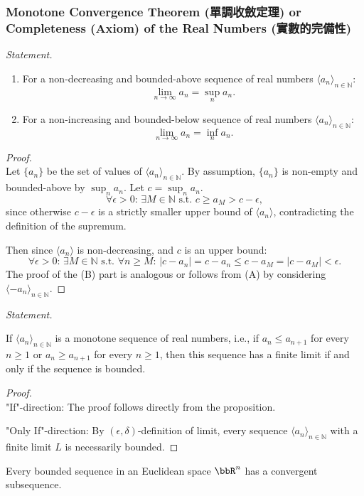 \documentclass[a4paper,12pt]{report}
\begin{document}
\subsubsection{Monotone Convergence Theorem (單調收斂定理) or Completeness (Axiom) of the Real Numbers (實數的完備性)}
\textit{Statement.}
\begin{enumerate}[label=(\Alph*)]
\item For a non-decreasing and bounded-above sequence of real numbers $\langle a_n\rangle_{n\in\mathbb {N}}$:
\[\lim_{n\to\infty}a_n=\sup_n a_n.\]
\item For a non-increasing and bounded-below sequence of real numbers $\langle a_n\rangle_{n\in\mathbb {N}}$:
\[\lim_{n\to\infty}a_n=\inf_n a_n.\]
\end{enumerate}
\begin{proof}\mbox{}\\
Let $\{a_{n}\}$ be the set of values of $\langle a_n\rangle_{n\in\mathbb {N}}$. By assumption, $\{a_n\}$ is non-empty and bounded-above by $\sup_n a_n$. Let $c=\sup_n a_n$.
\[\forall\epsilon>0:\,\exists M\in\mathbb {N}\text{\ s.t.\ }c\geq a_M>c-\epsilon,\]
since otherwise $c-\epsilon$ is a strictly smaller upper bound of $\langle a_n\rangle$, contradicting the definition of the supremum. 

Then since $\langle a_n\rangle$ is non-decreasing, and $c$ is an upper bound:
\[\forall\epsilon>0:\,\exists M\in\mathbb {N}\text{\ s.t.\ }\forall n\geq M:\,|c-a_n|=c-a_n\leq c-a_M=|c-a_M|<\epsilon.\]
The proof of the (B) part is analogous or follows from (A) by considering $\langle -a_{n}\rangle_{n\in \mathbb{N}}$.
\end{proof}
\textit{Statement.}

If $\langle a_n\rangle_{n\in\mathbb {N}}$ is a monotone sequence of real numbers, i.e., if 
$a_n\leq a_{n+1}$ for every $n\geq 1$ or $a_n\geq a_{n+1}$ for every $n\geq 1$, then this sequence has a finite limit if and only if the sequence is bounded.
\begin{proof}\mbox{}\\
"If"-direction: The proof follows directly from the proposition.

"Only If"-direction: By $(\epsilon,\delta)$-definition of limit, every sequence $\langle a_n\rangle_{n\in\mathbb {N}}$ with a finite limit $L$ is necessarily bounded.
\end{proof}
Every bounded sequence in an Euclidean space $\bbR^n$ has a convergent subsequence.
\end{document}
